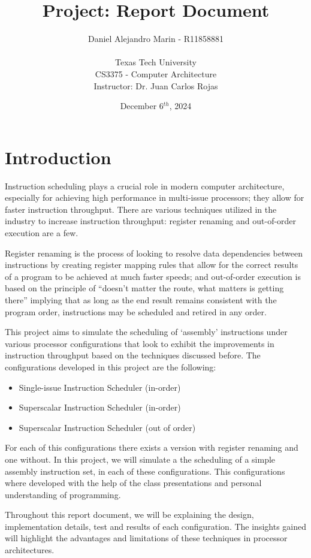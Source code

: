 \documentclass{article}
\title{Project: Report Document}
\author{Daniel Alejandro Marin - R11858881\\ \\ Texas Tech University \\CS3375 - Computer Architecture \\ Instructor: Dr. Juan Carlos Rojas}
\date{December 6$^{th}$, 2024}
\begin{document}
\maketitle
\tableofcontents
\newpage
\section{Introduction}
Instruction scheduling plays a crucial role in modern computer architecture, especially for achieving high performance in multi-issue processors; they allow for faster instruction throughput. There are various techniques utilized in the industry to increase instruction throughput: register renaming and out-of-order execution are a few. 

Register renaming is the process of looking to resolve data dependencies between instructions by creating register mapping rules that allow for the correct results of a program to be achieved at much faster speeds; and out-of-order execution is based on the principle of ``doesn't matter the route, what matters is getting there'' implying that as long as the end result remains consistent with the program order, instructions may be scheduled and retired in any order. 

This project aims to simulate the scheduling of `assembly' instructions under various processor configurations that look to exhibit the improvements in instruction throughput based on the techniques discussed before. The configurations developed in this project are the following:

\begin{itemize}
    \item Single-issue Instruction Scheduler (in-order)
    \item Superscalar Instruction Scheduler (in-order)
    \item Superscalar Instruction Scheduler (out of order) 
\end{itemize}

For each of this configurations there exists a version with register renaming and one without. In this project, we will simulate a the scheduling of a simple assembly instruction set, in each of these configurations. This configurations where developed with the help of the class presentations and personal understanding of programming.

Throughout this report document, we will be explaining the design, implementation details, test and results of each configuration. The insights gained will highlight the advantages and limitations of these techniques in processor architectures. 
\end{document}
